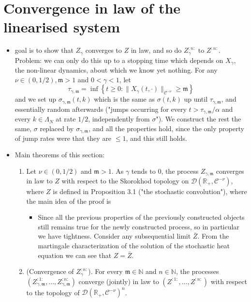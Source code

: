 \documentclass{report}
\theoremstyle{remark}
\theoremstyle{definition}
\begin{document}
\chapter{Convergence in law of the linearised system}
\begin{itemize}
  \item goal is to show that $Z_\gamma$ converges to $Z$ in law, and so do $Z_\gamma^{:n:}$ to $Z^{:n:}$. Problem: we can only do this up to a stopping time which depends on $X_\gamma$, the non-linear dynamics, about which we know yet nothing. For any $\nu \in (0, 1/2), \mathfrak{m} > 1$ and $0 < \gamma < 1$, let$$\tau_{\gamma, \mathfrak{m}} = \inf \left\{ t \ge 0 : \lVert X_\gamma(t, \cdot) \rVert_{\mathcal{C}^{-\nu}} \ge \mathfrak{m}\right\}$$and we set up $\sigma_{\gamma, \mathfrak{m}}(t, k)$ which is the same as $\sigma(t, k)$ up until $\tau_{\gamma, \mathfrak{m}}$, and essentially random afterwards ("jumps occurring for every $t > \tau_{\gamma, \mathfrak{m}}/\alpha$ and every $k\in \Lambda_N$ at rate $1/2$, independently from $\sigma$"). We construct the rest the same, $\sigma$ replaced by $\sigma_{\gamma, \mathfrak{m}}$, and all the properties hold, since the only property of jump rates were that they are $\le 1$, and this still holds.
  \item Main theorems of this section:
  \begin{enumerate}
    \item Let $\nu \in (0, 1/2)$ and $\mathfrak{m} > 1$. As $\gamma$ tends to $0$, the process $Z_{\gamma, \mathfrak{m}}$ converges in law to $Z$ with respect to the Skorokhod topology on $\mathcal{D}(\mathbb{R}_+, \mathcal{C}^{-\nu})$, where $Z$ is defined in Proposition 3.1 ("the stochastic convolution"), where the main idea of the proof is
    \begin{itemize}
      \item Since all the previous properties of the previously constructed objects still remains true for the newly constructed process, so in particular we have tightness. Consider any subsequential limit $\bar{Z}$. From the martingale characterization of the solution of the stochastic heat equation we can see that $Z = \bar{Z}$.
    \end{itemize}
    \item (Convergence of $Z_\gamma^{:n:}$). For every $\mathfrak{m} \in \mathbb{N}$ and $n \in \mathbb{N}$, the processes $(Z_{\gamma, \mathfrak{m}}^{:1:}, \ldots, Z_{\gamma, \mathfrak{m}}^{:n:})$ converge (jointly) in law to $(Z^{:1:}, \ldots, Z^{:n:})$ with respect to the topology of $\mathcal{D}(\mathbb{R}_+, \mathcal{C}^{-\nu})^n$.

\end{enumerate}
\end{itemize}
\end{document}
